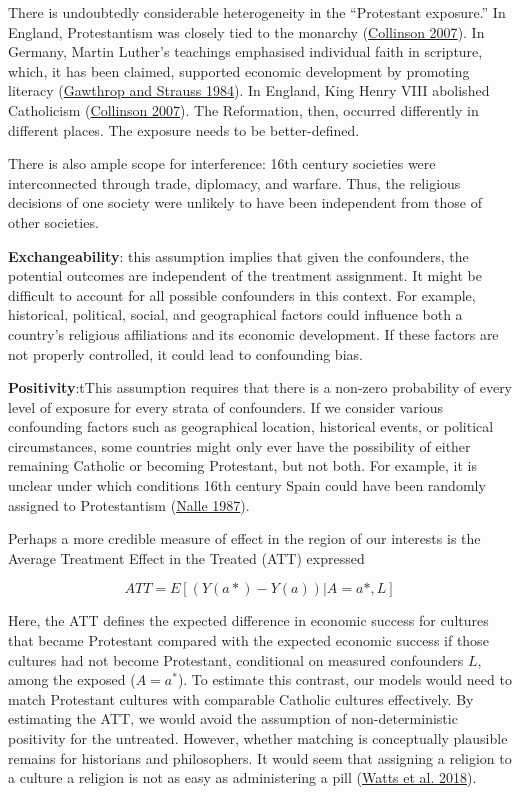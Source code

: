 \documentclass[
  singlecolumn]{article}
\begin{document}
There is undoubtedly considerable heterogeneity in the ``Protestant
exposure.'' In England, Protestantism was closely tied to the monarchy
(\protect\hyperlink{ref-collinson2007}{Collinson 2007}). In Germany,
Martin Luther's teachings emphasised individual faith in scripture,
which, it has been claimed, supported economic development by promoting
literacy (\protect\hyperlink{ref-gawthrop1984}{Gawthrop and Strauss
1984}). In England, King Henry VIII abolished Catholicism
(\protect\hyperlink{ref-collinson2007}{Collinson 2007}). The
Reformation, then, occurred differently in different places. The
exposure needs to be better-defined.

There is also ample scope for interference: 16th century societies were
interconnected through trade, diplomacy, and warfare. Thus, the
religious decisions of one society were unlikely to have been
independent from those of other societies.

\textbf{Exchangeability}: this assumption implies that given the
confounders, the potential outcomes are independent of the treatment
assignment. It might be difficult to account for all possible
confounders in this context. For example, historical, political, social,
and geographical factors could influence both a country's religious
affiliations and its economic development. If these factors are not
properly controlled, it could lead to confounding bias.

\textbf{Positivity}:tThis assumption requires that there is a non-zero
probability of every level of exposure for every strata of confounders.
If we consider various confounding factors such as geographical
location, historical events, or political circumstances, some countries
might only ever have the possibility of either remaining Catholic or
becoming Protestant, but not both. For example, it is unclear under
which conditions 16th century Spain could have been randomly assigned to
Protestantism (\protect\hyperlink{ref-nalle1987}{Nalle 1987}).

Perhaps a more credible measure of effect in the region of our interests
is the Average Treatment Effect in the Treated (ATT) expressed

\[ATT = E[(Y(a*)- Y(a))|A = a*,L]\]

Here, the ATT defines the expected difference in economic success for
cultures that became Protestant compared with the expected economic
success if those cultures had not become Protestant, conditional on
measured confounders \(L\), among the exposed (\(A = a^*\)). To estimate
this contrast, our models would need to match Protestant cultures with
comparable Catholic cultures effectively. By estimating the ATT, we
would avoid the assumption of non-deterministic positivity for the
untreated. However, whether matching is conceptually plausible remains
for historians and philosophers. It would seem that assigning a religion
to a culture a religion is not as easy as administering a pill
(\protect\hyperlink{ref-watts2018}{Watts et al. 2018}).
\end{document}
